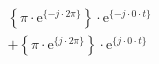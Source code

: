 \[
\begin{split}
&  \left \{ \pi \cdot \textrm{e}^{\{ -j \cdot 2\pi \}} \right \} \cdot \textrm{e}^{\{- j \cdot 0 \cdot t \}}\\
&+ \left \{ \pi \cdot \textrm{e}^{\{  j \cdot 2\pi \}} \right \} \cdot \textrm{e}^{\{  j \cdot 0 \cdot t \}}
\end{split}
\]
